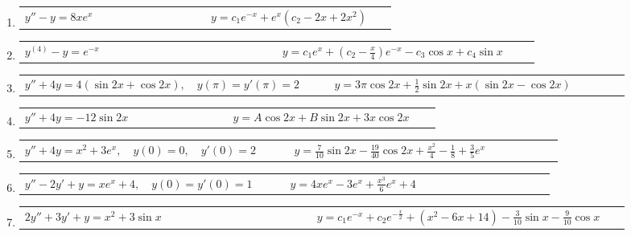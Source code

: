\documentclass[a4paper,12pt]{article}
\begin{document}
\begin{enumerate}
    \item
    \begin{tabularx}{\linewidth}{L{0.45\linewidth} R{0.45\linewidth}}
    \( y'' - y = 8 x e^x \) & \(\displaystyle y = c_1 e^{-x} + e^x (c_2 - 2x + 2x^2) \)
    \end{tabularx}

    \item
    \begin{tabularx}{\linewidth}{L{0.45\linewidth} R{0.45\linewidth}}
    \( y^{(4)} - y = e^{-x} \) & \(\displaystyle y = c_1 e^x + \left(c_2 - \frac{x}{4}\right) e^{-x} - c_3 \cos x + c_4 \sin x \)
    \end{tabularx}

    \item
    \begin{tabularx}{\linewidth}{L{0.45\linewidth} R{0.45\linewidth}}
    \( y'' + 4y = 4(\sin 2x + \cos 2x), \quad y(\pi) = y'(\pi) = 2 \) & \(\displaystyle y = 3 \pi \cos 2x + \frac{1}{2} \sin 2x + x(\sin 2x - \cos 2x) \)
    \end{tabularx}
    
  \item
    \begin{tabularx}{\linewidth}{L{0.45\linewidth} R{0.45\linewidth}}
    \( y'' + 4y = -12 \sin 2x \) & \(\displaystyle y = A \cos 2x + B \sin 2x + 3x \cos 2x \)
    \end{tabularx}
    
  \item
    \begin{tabularx}{\linewidth}{L{0.45\linewidth} R{0.45\linewidth}}
    \( y'' + 4y = x^2 + 3e^x, \quad y(0) = 0, \quad y'(0) = 2 \) & \(\displaystyle y = \frac{7}{10} \sin 2x - \frac{19}{40} \cos 2x + \frac{x^2}{4} - \frac{1}{8} + \frac{3}{5} e^x \)
    \end{tabularx}
    
  \item
    \begin{tabularx}{\linewidth}{L{0.45\linewidth} R{0.45\linewidth}}
    \( y'' - 2 y' + y = x e^x + 4, \quad y(0) = y'(0) = 1 \) & \(\displaystyle y = 4 x e^x - 3 e^x + \frac{x^3}{6} e^x + 4 \)
    \end{tabularx}
    
  \item
    \begin{tabularx}{\linewidth}{L{0.45\linewidth} R{0.45\linewidth}}
    \( 2 y'' + 3 y' + y = x^2 + 3 \sin x \) & \(\displaystyle y = c_1 e^{-x} + c_2 e^{-\frac{x}{2}} + (x^2 - 6x + 14) - \frac{3}{10} \sin x - \frac{9}{10} \cos x \)
    \end{tabularx}
\end{enumerate}
\end{document}
